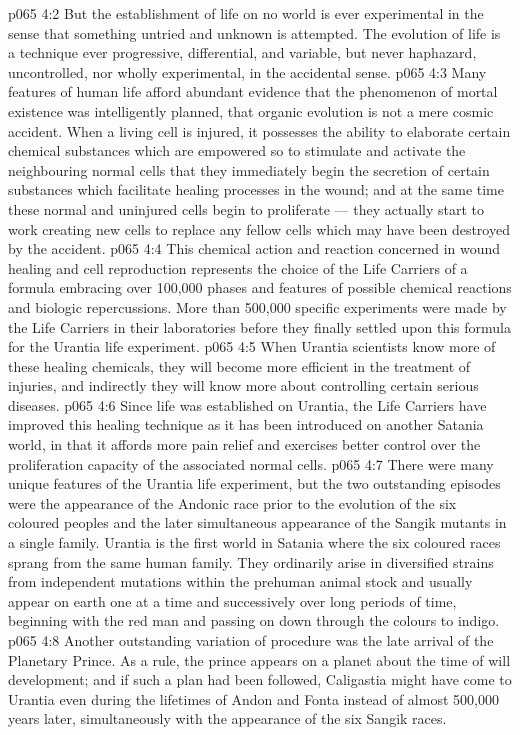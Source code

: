 \vs p065 4:2 But the establishment of life on no world is ever experimental in the sense that something untried and unknown is attempted. The evolution of life is a technique ever progressive, differential, and variable, but never haphazard, uncontrolled, nor wholly experimental, in the accidental sense.
\vs p065 4:3 \pc Many features of human life afford abundant evidence that the phenomenon of mortal existence was intelligently planned, that organic evolution is not a mere cosmic accident. When a living cell is injured, it possesses the ability to elaborate certain chemical substances which are empowered so to stimulate and activate the neighbouring normal cells that they immediately begin the secretion of certain substances which facilitate healing processes in the wound; and at the same time these normal and uninjured cells begin to proliferate --- they actually start to work creating new cells to replace any fellow cells which may have been destroyed by the accident.
\vs p065 4:4 This chemical action and reaction concerned in wound healing and cell reproduction represents the choice of the Life Carriers of a formula embracing over 100,000 phases and features of possible chemical reactions and biologic repercussions. More than 500,000 specific experiments were made by the Life Carriers in their laboratories before they finally settled upon this formula for the Urantia life experiment.
\vs p065 4:5 When Urantia scientists know more of these healing chemicals, they will become more efficient in the treatment of injuries, and indirectly they will know more about controlling certain serious diseases.
\vs p065 4:6 Since life was established on Urantia, the Life Carriers have improved this healing technique as it has been introduced on another Satania world, in that it affords more pain relief and exercises better control over the proliferation capacity of the associated normal cells.
\vs p065 4:7 \pc There were many unique features of the Urantia life experiment, but the two outstanding episodes were the appearance of the Andonic race prior to the evolution of the six coloured peoples and the later simultaneous appearance of the Sangik mutants in a single family. Urantia is the first world in Satania where the six coloured races sprang from the same human family. They ordinarily arise in diversified strains from independent mutations within the prehuman animal stock and usually appear on earth one at a time and successively over long periods of time, beginning with the red man and passing on down through the colours to indigo.
\vs p065 4:8 Another outstanding variation of procedure was the late arrival of the Planetary Prince. As a rule, the prince appears on a planet about the time of will development; and if such a plan had been followed, Caligastia might have come to Urantia even during the lifetimes of Andon and Fonta instead of almost 500,000 years later, simultaneously with the appearance of the six Sangik races.
